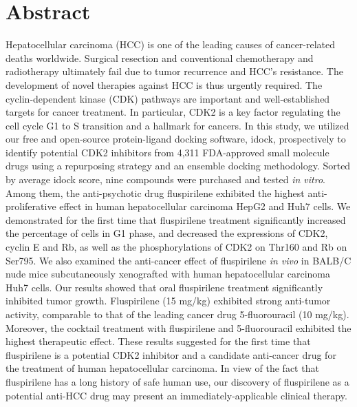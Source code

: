 \documentclass[10pt,letterpaper]{article}
\begin{document}
\section*{Abstract}

Hepatocellular carcinoma (HCC) is one of the leading causes of cancer-related deaths worldwide. Surgical resection and conventional chemotherapy and radiotherapy ultimately fail due to tumor recurrence and HCC's resistance. The development of novel therapies against HCC is thus urgently required. The cyclin-dependent kinase (CDK) pathways are important and well-established targets for cancer treatment. In particular, CDK2 is a key factor regulating the cell cycle G1 to S transition and a hallmark for cancers. In this study, we utilized our free and open-source protein-ligand docking software, idock, prospectively to identify potential CDK2 inhibitors from 4,311 FDA-approved small molecule drugs using a repurposing strategy and an ensemble docking methodology. Sorted by average idock score, nine compounds were purchased and tested \textit{in vitro}. Among them, the anti-psychotic drug fluspirilene exhibited the highest anti-proliferative effect in human hepatocellular carcinoma HepG2 and Huh7 cells. We demonstrated for the first time that fluspirilene treatment significantly increased the percentage of cells in G1 phase, and decreased the expressions of CDK2, cyclin E and Rb, as well as the phosphorylations of CDK2 on Thr160 and Rb on Ser795. We also examined the anti-cancer effect of fluspirilene \textit{in vivo} in BALB/C nude mice subcutaneously xenografted with human hepatocellular carcinoma Huh7 cells. Our results showed that oral fluspirilene treatment significantly inhibited tumor growth. Fluspirilene (15 mg/kg) exhibited strong anti-tumor activity, comparable to that of the leading cancer drug 5-fluorouracil (10 mg/kg). Moreover, the cocktail treatment with fluspirilene and 5-fluorouracil exhibited the highest therapeutic effect. These results suggested for the first time that fluspirilene is a potential CDK2 inhibitor and a candidate anti-cancer drug for the treatment of human hepatocellular carcinoma. In view of the fact that fluspirilene has a long history of safe human use, our discovery of fluspirilene as a potential anti-HCC drug may present an immediately-applicable clinical therapy.

\end{document}
